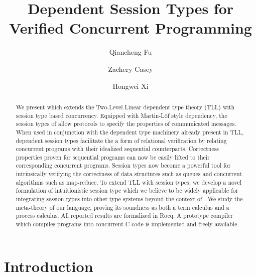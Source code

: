 \documentclass[acmsmall,10pt,anonymous]{acmart}
\begin{document}
\title{Dependent Session Types for Verified Concurrent Programming}

\author{Qiancheng Fu}

\author{Zachery Casey}

\author{Hongwei Xi}

\begin{abstract}
We present \TLLC{} which extends the Two-Level Linear dependent type theory
(TLL) with session type based concurrency. Equipped with Martin-L\"{o}f style
dependency, the session types of \TLLC{} allow protocols to specify the
properties of communicated messages. When used in conjunction with the dependent
type machinery already present in TLL, dependent session types facilitate the a
form of relational verification by relating concurrent programs with their
idealized sequential counterparts. Correctness properties proven for sequential
programs can now be easily lifted to their corresponding concurrent programs.
Session types now become a powerful tool for intrinsically verifying the
correctness of data structures such as queues and concurrent algorithms such as
map-reduce. To extend TLL with session types, we develop a novel formulation of
intuitionistic session type which we believe to be widely applicable for
integrating session types into other type systems beyond the context of \TLLC{}.
We study the meta-theory of our language, proving its soundness as both a term
calculus and a process calculus. All reported results are formalized in Rocq.
A prototype compiler which compiles \TLLC{} programs into concurrent C code is
implemented and freely available.
\end{abstract}

\maketitle

\section{Introduction}\label{sec:intro}

\end{document}
